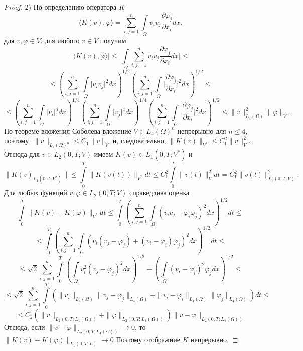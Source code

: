 \begin{proof}
        2) По определению оператора $K$
        $$\langle K(v),\varphi \rangle = \sum_{i,j=1}^{n}\int\limits_\Omega v_i v_j \frac{\partial \varphi_j}{\partial x_i}dx.$$
        для $v,\varphi\in V.$ для любого $v\in V$ получим
        $$\bigg|\langle K(v),\varphi \rangle\bigg|\le\bigg|\int\limits_{\Omega}\sum_{i,j=1}^{n}v_i v_j \frac{\partial \varphi_j}{\partial x_i}dx\bigg|\le$$
        $$\le(\sum_{i,j=1}^{n}\int\limits_{\Omega}\bigg|v_i v_j\bigg|^2 dx)^{1/2}(\sum_{i,j=1}^{n}\int\limits_{\Omega}\bigg|\frac{\partial \varphi_j}{\partial x_i}\bigg|^2 dx)^{1/2}\le$$
        $$\le(\sum_{i,j=1}^{n}\int\limits_{\Omega}\bigg|v_i\bigg|^4 dx)^{1/4}(\sum_{i,j=1}^{n}\int\limits_{\Omega}\bigg|v_j\bigg|^4 dx)^{1/4}
        (\sum_{i,j=1}^{n}\int\limits_{\Omega}\bigg|\frac{\partial \varphi_j}{\partial x_i}\bigg|^2 dx)^{1/2}\le
        \|v\|^2_{L_4(\Omega)}\|\varphi\|_V.$$
        По теореме вложения Соболева вложение $V\in L_4(\Omega)^n$ непрерывно для $n\le 4$, поэтому, $\|v\|_{L_4(\Omega)^n}\le C_1\|v\|_V$ и, следовательно,
        $\|K(v)\|_{V^*}\le C_1^2\|v\|^2_V.$ Отсюда для $v\in L_2(0,T;V)$ имеем $K(v)\in L_1(0,T;V^*)$ и 
        $$\|K(v)_{L_1(0,T;V^*)}\|\le\int\limits_0^T\|K(v(t))\|_{V^*} dt\le C_1^2\int\limits_0^T\|v(t)\|_V^2 dt=C_1^2\|v(t)\|_{L_2(0,T;V)}^2.$$
        Для любых функций $v,\varphi\in L_2(0,T;V)$ справедлива оценка
        $$\int\limits_0^T\|K(v)-K(\varphi)\|_{V^*} dt\le\int\limits_0^T(\sum_{i,j=1}^{n}\int\limits_\Omega (v_iv_j-\varphi_i\varphi_j)^2dx)^{1/2} dt\le$$
        $$\le\int\limits_0^T(\sum_{i,j=1}^{n}\int\limits_\Omega (v_i(v_j-\varphi_j)+(v_i-\varphi_i)\varphi_j)^2dx)^{1/2}dt\le$$
        $$\le\sqrt2\sum_{i,j=1}^{n}\int\limits_0^T (\int\limits_{\Omega}v^2_i(v_j-\varphi_j)^2dx)^{1/2}+
        (\int\limits_{\Omega}(v_i-\varphi_i)^2\varphi_j dx)^{1/2}\le$$
        $$\le\sqrt2\sum_{i,j=1}^{n}\int\limits_0^T(\|v_i\|_{L_4(\Omega)}\|v_j-\varphi_j\|_{L_4(\Omega)}
        +\|v_i-\varphi_i\|_{L_4(\Omega)}\|\varphi_j\|_{L_4(\Omega)})dt\le$$
        $$\le C_2(\|v\|_{L_2(0,T;L_4(\Omega))}+\|\varphi\|_{L_2(0,T;L_4(\Omega))})\|v-\varphi\|_{L_2(0,T;L_4(\Omega))}$$
        Отсюда, если $\|v-\varphi\|_{L_2(0,T;L_4(\Omega))}\rightarrow 0$, то $\|K(v)-K(\varphi)\|_{L_1(0,T;L)}\rightarrow 0$ Поэтому отображние $K$ непрерывно.
        
\end{proof}

